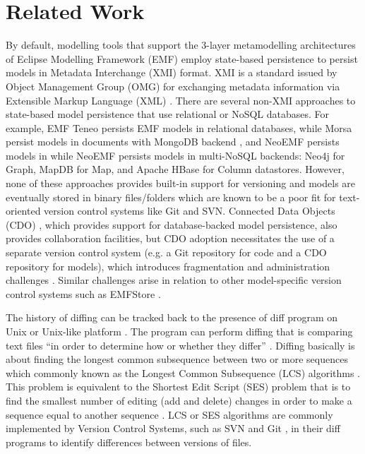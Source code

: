 \section{Related Work}
\label{sec:related_work}
By default, modelling tools that support the 3-layer metamodelling architectures of Eclipse Modelling Framework (EMF) \cite{steinberg2008emf} employ state-based persistence to persist models in Metadata Interchange (XMI) format. XMI is a standard issued by Object Management Group (OMG) for exchanging metadata information via Extensible Markup Language (XML) \cite{omg2018xmi}. There are several non-XMI approaches to state-based model persistence that use relational or NoSQL databases. For example, EMF Teneo \cite{eclipse2017teneo} persists EMF models in relational databases, while Morsa \cite{DBLP:conf/models/Espinazo-PaganCM11} persist models in documents with MongoDB backend \cite{mongodb}, and NeoEMF \cite{daniel2016neoemf} persists models in while NeoEMF persists models in multi-NoSQL backends: Neo4j \cite{neo4j2019neo4j} for Graph, MapDB \cite{mapdb2019mapdb} for Map, and Apache HBase \cite{apache2019hbase} for Column datastores. However, none of these approaches provides built-in support for versioning and models are eventually stored in binary files/folders which are known to be a poor fit for text-oriented version control systems like Git and SVN. Connected Data Objects (CDO) \cite{eclipse2019cdo}, which provides support for database-backed model persistence, also provides collaboration facilities, but CDO adoption necessitates the use of a separate version control system (e.g. a Git repository for code and a CDO repository for models), which introduces fragmentation and administration challenges \cite{barmpis2014evaluation}. Similar challenges arise in relation to other model-specific version control systems such as EMFStore \cite{koegel2010emfstore}.

The history of diffing can be tracked back to the presence of \textsf{diff} program on Unix or Unix-like platform \cite{hunt1976algorithm}. The program can perform diffing that is comparing text files ``in order to determine how or whether they differ'' \cite{diff}. Diffing basically is about finding the longest common subsequence between two or more sequences which commonly known as the Longest Common Subsequence (LCS) algorithms \cite{bergroth2000lcs}. This problem is equivalent to the Shortest Edit Script (SES) problem that is to find the smallest number of editing (add and delete) changes in order to make a sequence equal to another sequence \cite{DBLP:journals/algorithmica/Meyers86}. LCS or SES algorithms are commonly implemented by Version Control Systems, such as SVN \cite{svn-diff} and Git \cite{git-diff}, in their \textsf{diff} programs to identify differences between versions of files.   

